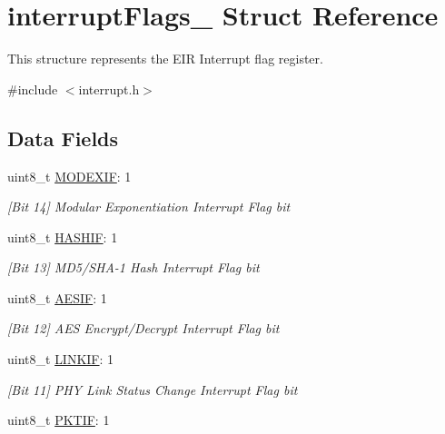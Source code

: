 \hypertarget{structinterrupt_flags__}{}\section{interrupt\+Flags\+\_\+ Struct Reference}
\label{structinterrupt_flags__}


This structure represents the E\+IR Interrupt flag register.  




{\ttfamily \#include $<$interrupt.\+h$>$}

\subsection*{Data Fields}
\begin{DoxyCompactItemize}
\item 
uint8\+\_\+t \mbox{\hyperlink{structinterrupt_flags___ad01e267d93eace1bc14b2e98c7a6e23b}{M\+O\+D\+E\+X\+IF}}\+: 1
\begin{DoxyCompactList}\small\item\em \mbox{[}Bit 14\mbox{]} Modular Exponentiation Interrupt Flag bit \end{DoxyCompactList}\item 
uint8\+\_\+t \mbox{\hyperlink{structinterrupt_flags___a083a2864d9aeecec83f03864835afd68}{H\+A\+S\+H\+IF}}\+: 1
\begin{DoxyCompactList}\small\item\em \mbox{[}Bit 13\mbox{]} M\+D5/\+S\+H\+A-\/1 Hash Interrupt Flag bit \end{DoxyCompactList}\item 
uint8\+\_\+t \mbox{\hyperlink{structinterrupt_flags___a710067270606b70dbaf2bbb5aadb5ce9}{A\+E\+S\+IF}}\+: 1
\begin{DoxyCompactList}\small\item\em \mbox{[}Bit 12\mbox{]} A\+ES Encrypt/\+Decrypt Interrupt Flag bit \end{DoxyCompactList}\item 
uint8\+\_\+t \mbox{\hyperlink{structinterrupt_flags___a4f301cfd9cfc49b105a5f703947a2298}{L\+I\+N\+K\+IF}}\+: 1
\begin{DoxyCompactList}\small\item\em \mbox{[}Bit 11\mbox{]} P\+HY Link Status Change Interrupt Flag bit \end{DoxyCompactList}\item 
uint8\+\_\+t \mbox{\hyperlink{structinterrupt_flags___a4bfff8bb603cb3baf42fabe79d5e0a39}{P\+K\+T\+IF}}\+: 1

\end{DoxyCompactItemize}
